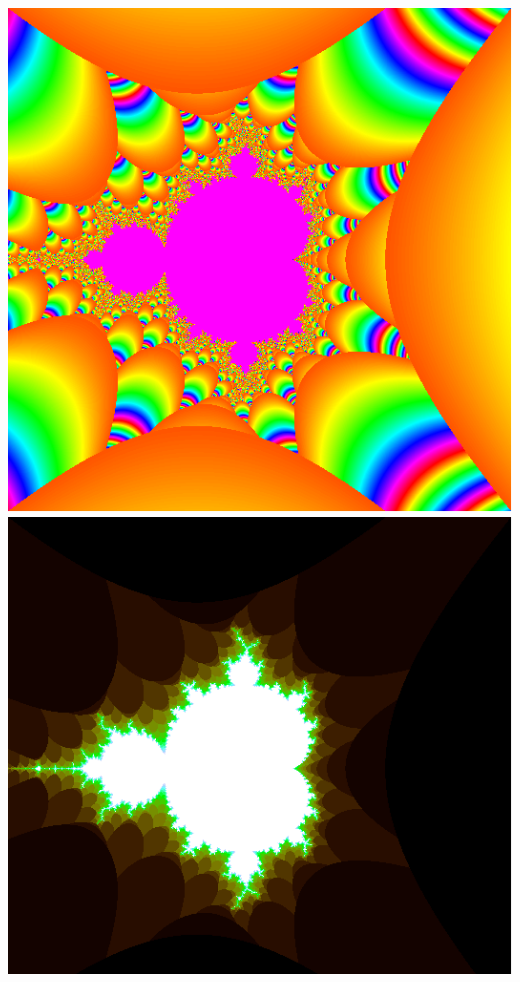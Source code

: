 \documentclass[../resume.tex]{subfiles}
\begin{document}
\noindent
\includegraphics[scale=0.15]{../TAing/mandel/rainbow.png}
\includegraphics[scale=0.15]{../TAing/mandel/light.png}
\end{document}
